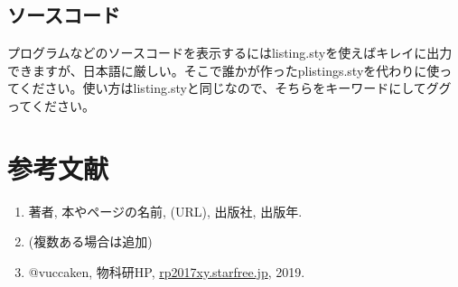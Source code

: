 \documentclass[11pt,b5paper,papersize,dvipdfmx]{jsbook}
\begin{document}
%
\subsection{ソースコード}
プログラムなどのソースコードを表示するにはlisting.styを使えばキレイに出力できますが、日本語に厳しい。そこで誰かが作ったplistings.styを代わりに使ってください。使い方はlisting.styと同じなので、そちらをキーワードにしてググってください。

%
\section*{参考文献}
\renewcommand{\labelenumi}{[\arabic{enumi}]} %
\begin{enumerate}
  \item 著者, 本やページの名前, (URL), 出版社, 出版年.
  \item (複数ある場合は追加)
  \item @vuccaken, 物科研HP, \url{rp2017xy.starfree.jp}, 2019.
\end{enumerate}
\renewcommand{\labelenumi}{\arabic{enumi}.} %
\end{document}
